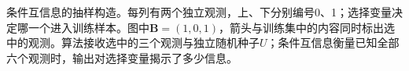 条件互信息的抽样构造。每列有两个独立观测，上、下分别编号0、1；选择变量决定哪一个进入训练样本。图中$\bm B=(1,0,1)$，箭头与训练集中的内容同时标出选中的观测。算法接收选中的三个观测与独立随机种子$U$；条件互信息衡量已知全部六个观测时，输出对选择变量揭示了多少信息。
